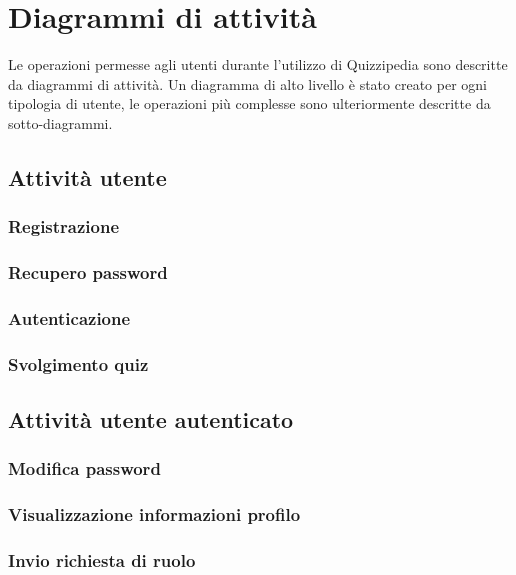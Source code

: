 \documentclass[a4paper, titlepage]{article}
\begin{document}
\section{Diagrammi di attività}
Le operazioni permesse agli utenti durante l’utilizzo di Quizzipedia sono descritte da diagrammi di attività. Un diagramma di alto livello è stato creato per ogni tipologia di utente, le operazioni più complesse sono ulteriormente descritte da sotto-diagrammi.

\subsection{Attività utente}


\subsubsection{Registrazione}

\subsubsection{Recupero password}

\subsubsection{Autenticazione}

\subsubsection{Svolgimento quiz}

\subsection{Attività utente autenticato}

\subsubsection{Modifica password}

\subsubsection{Visualizzazione informazioni profilo}

\subsubsection{Invio richiesta di ruolo}
\end{document}
